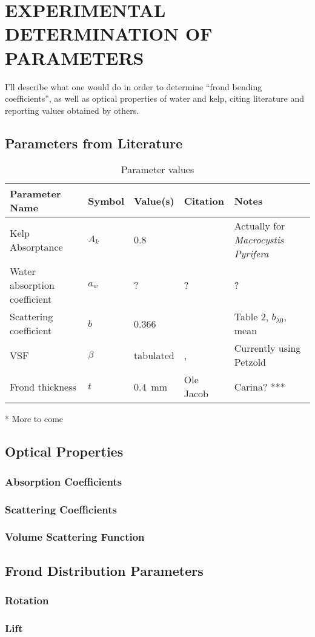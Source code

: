 \chapter{EXPERIMENTAL DETERMINATION OF PARAMETERS} \label{ch:experiment}

I'll describe what one would do in order to determine
``frond bending coefficients'', as well as optical properties of water and kelp,
citing literature and reporting values obtained by others.

\section{Parameters from Literature}
\begin{table}
  \caption{Parameter values}
  \centering
  \begin{tabular}{p{} p{} p{} p{} p{}}
    \toprule
    Parameter Name & Symbol & Value(s) & Citation & Notes \\
    \midrule
    Kelp Absorptance & $A_k$ & 0.8 & \cite{colombo-pallotta_photosynthetic_2006} & Actually for \textit{Macrocystis Pyrifera}\\
    Water absorption coefficient & $a_w$ & ? & ? & ? \\
    Scattering coefficient & $b$ & 0.366 & \cite{sokolov_parameterization_2010} & Table 2, $b_{\lambda 0}$, mean \\
    VSF & $\beta$ & tabulated & \cite{petzold_volume_1972,sokolov_parameterization_2010}, & Currently using Petzold \\ 
    Frond thickness & $t$ & \SI{0.4}{\mm} & Ole Jacob & Carina?  *** \\
    \bottomrule
  \end{tabular}
\end{table}

* More to come

\section{Optical Properties}
\subsection{Absorption Coefficients}
\subsection{Scattering Coefficients}
\subsection{Volume Scattering Function}

\section{Frond Distribution Parameters}
\subsection{Rotation}
\subsection{Lift}
